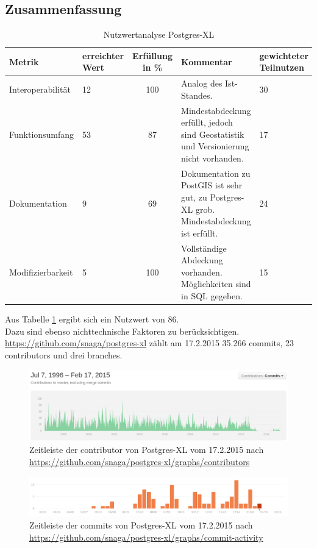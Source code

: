\subsection{Zusammenfassung}
\begin{table}[h!]
\centering
\small
\begin{tabular}{l|p{1.8cm}|c|p{3.1cm}|p{1.8cm}}
\textbf{Metrik} & \textbf{erreichter Wert} & \textbf{Erfüllung in \%} & \textbf{Kommentar} & \textbf{gewichteter Teilnutzen} \\ \hline
Interoperabilität & 12 & 100 & Analog des Ist-Standes. & 30 \\ \hline
Funktionsumfang & 53 & 87 & Mindestabdeckung erfüllt, jedoch sind Geostatistik und Versionierung nicht vorhanden. & 17 \\ \hline
Dokumentation & 9 & 69 & Dokumentation zu PostGIS ist sehr gut, zu Postgres-XL grob. Mindestabdeckung ist erfüllt. & 24 \\ \hline
Modifizierbarkeit & 5 & 100 & Vollständige Abdeckung vorhanden. Möglichkeiten sind in SQL gegeben. & 15 \\
\end{tabular}
\caption{Nutzwertanalyse Postgres-XL}
\label{table:nutzwertanalyse-postgresxl}
\end{table}
Aus Tabelle \ref{table:nutzwertanalyse-postgresxl} ergibt sich ein Nutzwert von 86.\\
Dazu sind ebenso nichttechnische Faktoren zu berücksichtigen.\\
\url{https://github.com/snaga/postgres-xl} zählt am 17.2.2015 35.266 commits, 23 contributors und drei branches.
\begin{figure}[h!]
\centering
\includegraphics[width=\textwidth]{Abbildungen/postgresxl_timeline_contributors.png}
\caption[Zeitleiste der contributor von Postgres-XL]{Zeitleiste der contributor von Postgres-XL vom 17.2.2015 nach \url{https://github.com/snaga/postgres-xl/graphs/contributors}}
\label{fig:timeline_contr_postgresxl}
\end{figure}
\begin{figure}[h!]
\centering
\includegraphics[width=\textwidth]{Abbildungen/postgresxl_timeline_commits.png}
\caption[Zeitleiste der commits von Postgres-XL]{Zeitleiste der commits von Postgres-XL vom 17.2.2015 nach \url{https://github.com/snaga/postgres-xl/graphs/commit-activity}}
\label{fig:timeline_commits_postgresxl}
\end{figure}
